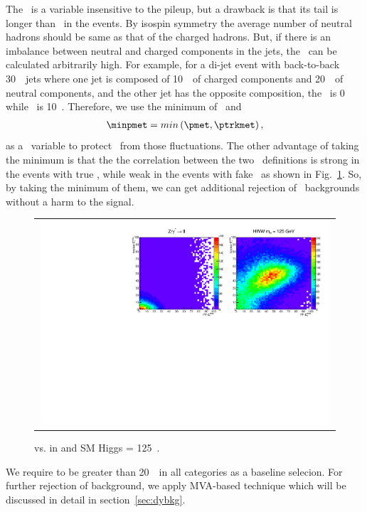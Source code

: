 The \trkmet\ is a variable insensitive to the pileup, 
but a drawback is that its tail is longer than \pfmet\ in the \dyll{} events. 
By isospin symmetry the average number of neutral hadrons should 
be same as that of the charged hadrons. But, if there is an imbalance between neutral 
and charged components in the jets, the \trkmet\ can be calculated arbitrarily high. 
For example, for a di-jet event with back-to-back 30~\GeV\ jets where one jet is composed 
of 10~\GeV\ of charged components and 20~\GeV\ of neutral components, and the other jet 
has the opposite composition, the \pfmet\ is 0 while \trkmet\ is 10~\GeV. 
Therefore, we use the minimum of \pfmet\ and \trkmet\, 
\begin{eqnarray} 
\minpmet = min \left( \pmet, \ptrkmet \right), 
\end{eqnarray} 
as a \met\ variable to protect \trkmet\ from those fluctuations. 
The other advantage of taking the minimum is that the the correlation 
between the two \met\ definitions is strong in the events with true \met, 
while weak in the events with fake \met\ as shown in Fig.~\ref{fig:2dmet}. 
So, by taking the minimum of them, we can get additional rejection 
of \dyll\ backgrounds without a harm to the signal.  
%
\begin{figure}[htp] 
\centering 
\begin{tabular}{c} 
\includegraphics[width=0.99\textwidth]{figures/2dmet.pdf} 
\end{tabular} 
\caption{\pmet{} vs. \ptrkmet{} in \dyll{} and SM Higgs \mHi = 125~\GeV.}
\label{fig:2dmet} 
\end{figure}  

We require \minpmet{} to be greater than 20~\GeV\ in all categories as a baseline selecion. 
For further rejection of \dyll{} background, we apply MVA-based technique which will be 
discussed in detail in section~\ref{sec:dybkg}. 

